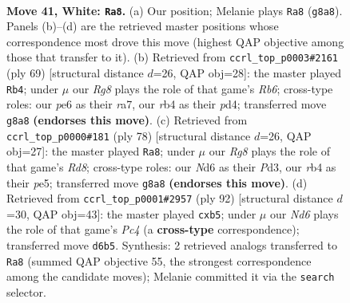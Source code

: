\documentclass[11pt]{article}
\begin{document}
\clearpage

\begin{figure}[p]\centering
\begin{subfigure}{0.46\textwidth}\centering
\resizebox{\linewidth}{!}{%
\newchessgame
\chessboard[
  setfen={6R1/6pk/3Npp2/1p5p/1r1P1P1P/4P1P1/6K1/8 w - - 2 41},
  showmover=false,
  pgfstyle=straightmove, color=movearrow, markmove={g8-a8}
]}
\caption{}
\end{subfigure}\hfill
\begin{subfigure}{0.46\textwidth}\centering
\resizebox{\linewidth}{!}{%
\newchessgame
\chessboard[
  setfen={8/R1p2pp1/2k1p2p/P2p4/3P2PP/1r3P2/2K1P3/8 b - - 6 35},
  showmover=false,
  pgfstyle=straightmove, color=movearrow, markmove={b3-b4}
]}
\caption{}
\end{subfigure}
\\[4pt]
\begin{subfigure}{0.46\textwidth}\centering
\resizebox{\linewidth}{!}{%
\newchessgame
\chessboard[
  setfen={3R4/4kr1p/2p3p1/4p3/3p2PP/3P1P2/2P1K3/8 w - - 1 40},
  showmover=false,
  pgfstyle=straightmove, color=movearrow, markmove={d8-a8}
]}
\caption{}
\end{subfigure}\hfill
\begin{subfigure}{0.46\textwidth}\centering
\resizebox{\linewidth}{!}{%
\newchessgame
\chessboard[
  setfen={8/5k2/3pR1p1/rp1P1p2/1pP2P2/1P5P/8/6K1 w - - 0 47},
  showmover=false,
  pgfstyle=straightmove, color=movearrow, markmove={c4-b5}
]}
\caption{}
\end{subfigure}
\caption{\textbf{Move 41, White: \texttt{Ra8}.} (a) Our position; Melanie plays \texttt{Ra8} (\texttt{g8a8}). Panels (b)--(d) are the retrieved master positions whose correspondence most drove this move (highest QAP objective among those that transfer to it). (b) Retrieved from \texttt{ccrl\_top\_p0003\#2161} (ply 69) [structural distance $d$=26, QAP obj=28]: the master played \texttt{Rb4}; under $\mu$ our \emph{Rg8} plays the role of that game's \emph{Rb6}; cross-type roles: our \emph{p}e6 as their \emph{r}a7, our \emph{r}b4 as their \emph{p}d4; transferred move \texttt{g8a8} \textbf{(endorses this move)}. (c) Retrieved from \texttt{ccrl\_top\_p0000\#181} (ply 78) [structural distance $d$=26, QAP obj=27]: the master played \texttt{Ra8}; under $\mu$ our \emph{Rg8} plays the role of that game's \emph{Rd8}; cross-type roles: our \emph{N}d6 as their \emph{P}d3, our \emph{r}b4 as their \emph{p}e5; transferred move \texttt{g8a8} \textbf{(endorses this move)}. (d) Retrieved from \texttt{ccrl\_top\_p0001\#2957} (ply 92) [structural distance $d$=30, QAP obj=43]: the master played \texttt{cxb5}; under $\mu$ our \emph{Nd6} plays the role of that game's \emph{Pc4} (a \textbf{cross-type} correspondence); transferred move \texttt{d6b5}. Synthesis: 2 retrieved analogs transferred to \texttt{Ra8} (summed QAP objective 55, the strongest correspondence among the candidate moves); Melanie committed it via the \texttt{search} selector.}
\label{fig:thought-m80}
\end{figure}
\end{document}
